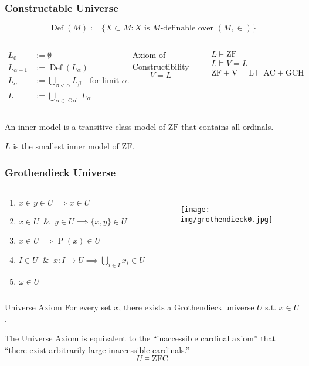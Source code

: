 \documentclass[UTF8,aspectratio=43,11pt,colorlinks,compress,openany]{beamer}%
\begin{document}
\begin{frame}\frametitle{Constructable Universe}
\setlength\abovedisplayskip{0pt}
\setlength\belowdisplayskip{0pt}
\[\operatorname{Def}(M):=\big\{X\subset M: X \mbox{ is $M$-definable over } (M,\in)\big\}\]
\begin{columns}
\begin{definition}
\begin{align*}
L_0&:=\emptyset\\
L_{\alpha+1}&:=\operatorname{Def}(L_\alpha)\\
L_\alpha&:=\bigcup\limits_{\beta<\alpha}L_\beta \quad\mbox{for limit } \alpha.\\
L&:=\bigcup\limits_{\alpha\in\operatorname{Ord}}L_\alpha
\end{align*}
\end{definition}
\begin{block}{Axiom of Constructibility}
\[V=L\]
\end{block}
\begin{align*}
&L\vDash\mathrm{ZF}\\
&L\vDash V=L\\
&\mathrm{ZF+V=L}\vdash\mathrm{AC+GCH}
\end{align*}
\end{columns}
An inner model is a transitive class model of $\mathrm{ZF}$ that contains all ordinals.

$L$ is the smallest inner model of $\mathrm{ZF}$.
\end{frame}

\begin{frame}\frametitle{Grothendieck Universe}
\begin{columns}
\begin{definition}
\begin{enumerate}
\item $x\in y\in U\implies x\in U$
\item $x\in U\;\; \&\;\; y\in U\implies \{x,y\}\in U$
\item $x\in U\implies \operatorname{P}(x)\in U$
\item $I\in U\;\; \&\;\; x: I\to U\implies\bigcup\limits_{i\in I}x_i\in U$
\item $\omega\in U$
\end{enumerate}
\end{definition}
\begin{figure}
\texttt{[image: img/grothendieck0.jpg]}
\end{figure}
\end{columns}
\begin{block}{Universe Axiom}
For every set $x$, there exists a Grothendieck universe $U$ s.t. $x\in U$.
\end{block}
\begin{center}
\end{center}
The Universe Axiom is equivalent to the ``inaccessible cardinal axiom'' that ``there exist arbitrarily large inaccessible cardinals.''
\[U\vDash\mathrm{ZFC}\]
\end{frame}
\end{document}
